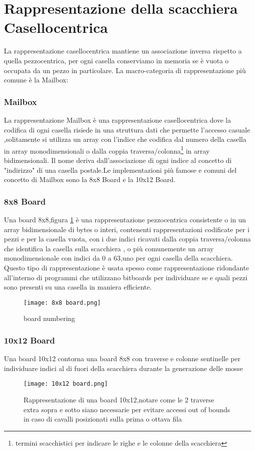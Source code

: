 \vfill
\clearpage


\section{Rappresentazione della scacchiera Casellocentrica}
La rappresentazione casellocentrica  mantiene un associazione inversa rispetto a quella pezzocentrica,
per ogni casella conserviamo in memoria se è vuota o occupata da un pezzo in particolare.
La macro-categoria di  rappresentazione più comune è la Mailbox:

\subsubsection{Mailbox}
La rappresentazione Mailbox è una rappresentazione casellocentrica dove la codifica di ogni casella risiede in una struttura dati
che permette l'accesso casuale ,solitamente si utilizza un array con l'indice che codifica dal numero della casella in array monodimensionali
o dalla coppia traversa/colonna\footnote{termini scacchistici per indicare le righe e le colonne della scacchiera} in array bidimensionali.
Il nome deriva dall'associazione di ogni indice al concetto di "indirizzo" di una casella postale.Le implementazioni più famose e
comuni del concetto di Mailbox sono la 8x8 Board e la 10x12 Board.

\subsubsection{8x8 Board}
Una board 8x8,figura \ref{otto} è una rappresentazione pezzocentrica consistente o in un array bidimensionale di bytes o interi, contenenti rappresentazioni codificate
per i pezzi e per la casella vuota, con i due indici ricavati dalla coppia traversa/colonna che identifica la casella sulla scacchiera ,
o più comunemente un array monodimensionale con indici da 0 a 63,uno per ogni casella della scacchiera.
Questo tipo di rappresentazione è usata spesso come rappresentazione ridondante all'interno di programmi che utilizzano bitboards
per individuare se e quali pezzi sono presenti su una casella in maniera efficiente.
\begin{figure}[!ht]
    \centering
    \texttt{[image: 8x8 board.png]}
    \caption{board numbering}
    \label{otto}
\end{figure}

\subsubsection{10x12 Board}
Una board 10x12  contorna una  board 8x8   con traverse e colonne sentinelle  per individuare  indici al di fuori della scacchiera durante la generazione delle mosse
\vfill
\begin{figure}[!ht]
    \centering
    \texttt{[image: 10x12 board.png]}
    \caption{Rappresentazione di una board 10x12,notare come le 2 traverse extra sopra e sotto siano necessarie per evitare accessi out of bounds in caso di cavalli posizionati sulla prima o ottava fila }
\end{figure}
\vfill
\clearpage


